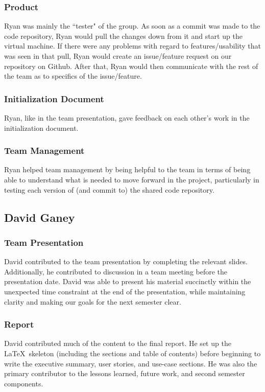\documentclass[12pt]{article}
\begin{document}
\begin{spacing}{1.5}
\subsubsection{Product}
Ryan was mainly the ``tester" of the group. As soon as a commit was made to the code repository, Ryan would pull the changes down from it and start up the virtual machine. If there were any problems with regard to features/usability that was seen in that pull, Ryan would create an issue/feature request on our repository on Github. After that, Ryan would then communicate with the rest of the team as to specifics of the issue/feature.
\subsubsection{Initialization Document}
Ryan, like in the team presentation, gave feedback on each other's work in the initialization document. 
\subsubsection{Team Management}
Ryan helped team management by being helpful to the team in terms of being able to understand what is needed to move forward in the project, particularly in testing each version of (and commit to) the shared code repository. 

\clearpage

\subsection{David Ganey}
\subsubsection{Team Presentation}
David contributed to the team presentation by completing the relevant slides. Additionally, he contributed to discussion in a team meeting before the presentation date. David was able to present his material succinctly within the unexpected time constraint at the end of the presentation, while maintaining clarity and making our goals for the next semester clear.
\subsubsection{Report}
David contributed much of the content to the final report. He set up the \LaTeX\ skeleton (including the sections and table of contents) before beginning to write the executive summary, user stories, and use-case sections. He was also the primary contributor to the lessons learned, future work, and second semester components.

\end{spacing}
\end{document}

